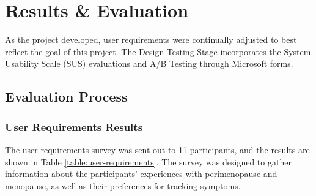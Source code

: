 \section{Results \& Evaluation}\label{results}

As the project developed, user requirements were continually adjusted to best reflect the goal of this project. The Design Testing Stage incorporates the System Usability Scale (SUS) evaluations and A/B Testing through Microsoft forms. 

\subsection{Evaluation Process}

\subsubsection{User Requirements Results}

The user requirements survey was sent out to 11 participants, and the results are shown in Table \ref{table:user-requirements}. The survey was designed to gather information about the participants' experiences with perimenopause and menopause, as well as their preferences for tracking symptoms.

